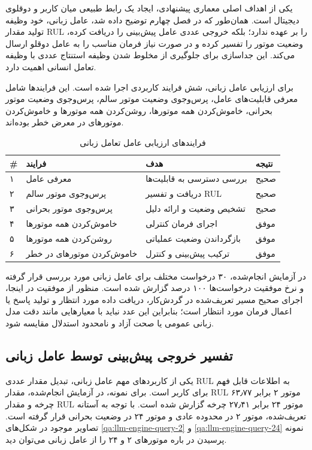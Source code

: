 یکی از اهداف اصلی معماری پیشنهادی، ایجاد یک رابط طبیعی میان کاربر و دوقلوی دیجیتال است. همان‌طور که در فصل چهارم توضیح داده شد، عامل زبانی، خود وظیفه تولید مقدار \gls{RUL} را بر عهده ندارد؛ بلکه خروجی عددی عامل پیش‌بینی را دریافت کرده، وضعیت موتور را تفسیر کرده و در صورت نیاز فرمان مناسب را به عامل دوقلو ارسال می‌کند. این جداسازی برای جلوگیری از مخلوط شدن وظیفه استنتاج عددی با وظیفه تعامل انسانی اهمیت دارد.

برای ارزیابی عامل زبانی، شش فرایند کاربردی اجرا شده است. این فرایند‌ها شامل معرفی قابلیت‌های عامل، پرس‌وجوی وضعیت موتور سالم، پرس‌وجوی وضعیت موتور بحرانی، خاموش‌کردن همه موتورها، روشن‌کردن همه موتورها و خاموش‌کردن موتورهای در معرض خطر بوده‌اند.

\begin{table}[ht]
	\centering
	\caption{فرایند‌های ارزیابی عامل تعامل زبانی}
	\label{tab:llm-case-final}
	\begin{tabular}{p{0.6cm}p{3.3cm}p{5cm}p{3cm}}
		\toprule
		\textbf{\#} & \textbf{فرایند} & \textbf{هدف} & \textbf{نتیجه} \\
		\midrule
		۱ & معرفی عامل & بررسی دسترسی به قابلیت‌ها & صحیح \\
		۲ & پرس‌وجوی موتور سالم & دریافت و تفسیر \gls{RUL} & صحیح \\
		۳ & پرس‌وجوی موتور بحرانی & تشخیص وضعیت و ارائه دلیل & صحیح \\
		۴ & خاموش‌کردن همه موتورها & اجرای فرمان کنترلی & موفق \\
		۵ & روشن‌کردن همه موتورها & بازگرداندن وضعیت عملیاتی & موفق \\
		۶ & خاموش‌کردن موتورهای در خطر & ترکیب پیش‌بینی و کنترل & موفق \\
		\bottomrule
	\end{tabular}
\end{table}

در آزمایش انجام‌شده، ۳۰ درخواست مختلف برای عامل زبانی مورد بررسی قرار گرفته و نرخ موفقیت درخواست‌ها ۱۰۰ درصد گزارش شده است. منظور از موفقیت در اینجا، اجرای صحیح مسیر تعریف‌شده در گردش‌کار، دریافت داده مورد انتظار و تولید پاسخ یا اعمال فرمان مورد انتظار است؛ بنابراین این عدد نباید با معیارهایی مانند دقت مدل زبانی عمومی یا صحت آزاد و نامحدود استدلال مقایسه شود.

\subsection{تفسیر خروجی پیش‌بینی توسط عامل زبانی}

یکی از کاربردهای مهم عامل زبانی، تبدیل مقدار عددی \gls{RUL} به اطلاعات قابل فهم برای کاربر است. برای نمونه، در آزمایش انجام‌شده، مقدار \gls{RUL} موتور ۲ برابر ۶۳٫۷۷ چرخه و مقدار \gls{RUL} موتور ۲۴ برابر ۲۷٫۴۱ چرخه گزارش شده است. با توجه به آستانه تعریف‌شده، موتور ۲ در محدوده عادی و موتور ۲۴ در وضعیت بحرانی قرار گرفته است. تصاویر موجود در شکل‌های 
\ref{qa:llm-engine-query-2}
و
\ref{qa:llm-engine-query-24}
نمونه پرسیدن در باره موتور‌های ۲ و ۲۴ را از عامل زبانی می‌توان دید.

